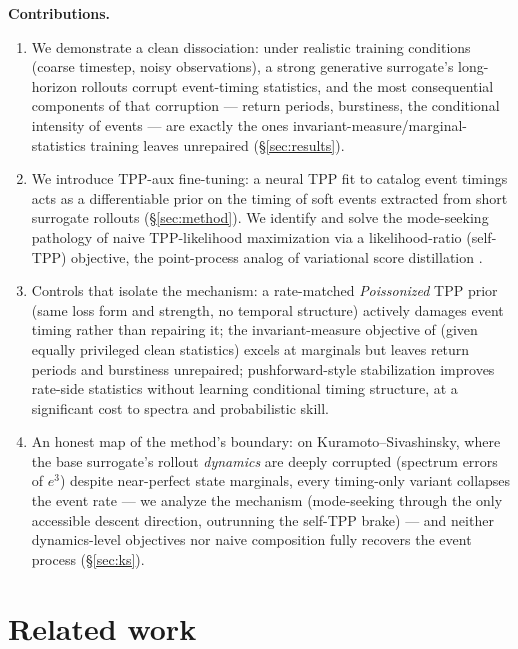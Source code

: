 \documentclass[11pt]{article}
\begin{document}
\textbf{Contributions.}
\begin{enumerate}
  \item We demonstrate a clean dissociation: under realistic training
  conditions (coarse timestep, noisy observations), a strong generative
  surrogate's long-horizon rollouts corrupt event-timing statistics, and
  the most consequential components of that corruption --- return periods,
  burstiness, the conditional intensity of events --- are exactly the ones
  invariant-measure/marginal-statistics training leaves unrepaired
  (\S\ref{sec:results}).
  \item We introduce TPP-aux fine-tuning: a neural TPP fit to catalog event
  timings acts as a differentiable prior on the timing of soft events
  extracted from short surrogate rollouts (\S\ref{sec:method}). We identify
  and solve the mode-seeking pathology of naive TPP-likelihood maximization
  via a likelihood-ratio (self-TPP) objective, the point-process analog of
  variational score distillation \citep{wang2023prolificdreamer,luo2023diffinstruct}.
  \item Controls that isolate the mechanism: a rate-matched
  \emph{Poissonized} TPP prior (same loss form and strength, no temporal
  structure) actively damages event timing rather than repairing it; the
  invariant-measure objective of \citet{jiang2023training} (given equally
  privileged clean statistics) excels at marginals but leaves return
  periods and burstiness unrepaired; pushforward-style stabilization
  \citep{brandstetter2022message} improves rate-side statistics without
  learning conditional timing structure, at a significant cost to spectra
  and probabilistic skill.
  \item An honest map of the method's boundary: on Kuramoto--Sivashinsky,
  where the base surrogate's rollout \emph{dynamics} are deeply corrupted
  (spectrum errors of $e^{3}$) despite near-perfect state marginals, every
  timing-only variant collapses the event rate --- we analyze the
  mechanism (mode-seeking through the only accessible descent direction,
  outrunning the self-TPP brake) --- and neither dynamics-level objectives
  nor naive composition fully recovers the event process
  (\S\ref{sec:ks}).
\end{enumerate}

\section{Related work}
\label{sec:related}
\end{document}
